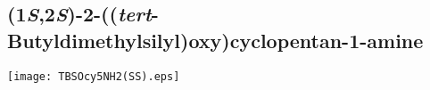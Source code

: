 \subsection{(1\textit{S},2\textit{S})\hyp{}2\hyp{}((\textit{tert}\hyp{}Butyldimethylsilyl)oxy)cyclopentan\hyp{}1\hyp{}amine }


\begin{scheme}[H]
	\begin{center}
		\texttt{[image: TBSOcy5NH2(SS).eps]}
	\end{center}
\end{scheme}


